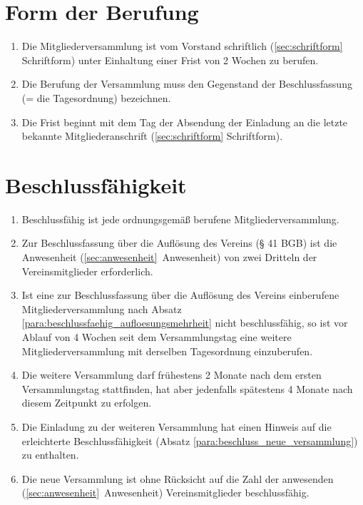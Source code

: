 \documentclass[a4paper]{article}
\begin{document}
\section{Form der Berufung}\label{sec:form_der_berufung}

\begin{enumerate}
\item Die Mitgliederversammlung ist vom Vorstand schriftlich (\ref{sec:schriftform} Schriftform) unter Einhaltung einer Frist von 2 Wochen zu berufen.
\item Die Berufung der Versammlung muss den Gegenstand der Beschlussfassung (= die Tagesordnung) bezeichnen.
\item Die Frist beginnt mit dem Tag der Absendung der Einladung an die letzte bekannte Mitgliederanschrift (\ref{sec:schriftform} Schriftform).
\end{enumerate}


\section{Beschlussfähigkeit}\label{sec:beschlussfaehigkeit}

\begin{enumerate}
\item Beschlussfähig ist jede ordnungsgemäß berufene Mitgliederversammlung.\label{para:beschlussfaehig_ordnungsgemaess}
\item Zur Beschlussfassung über die Auflösung des Vereins (§ 41 BGB) ist die Anwesenheit (\ref{sec:anwesenheit}~Anwesenheit) von zwei Dritteln der Vereinsmitglieder erforderlich.\label{para:beschlussfaehig_aufloesungsmehrheit}
\item Ist eine zur Beschlussfassung über die Auflösung des Vereins einberufene Mitgliederversammlung nach Absatz \ref{para:beschlussfaehig_aufloesungsmehrheit} nicht beschlussfähig, so ist vor Ablauf von 4 Wochen seit dem Versammlungstag eine weitere Mitgliederversammlung mit derselben Tagesordnung einzuberufen.\label{para:beschlussfaehig_alternative_mv}
\item Die weitere Versammlung darf frühestens 2 Monate nach dem ersten Versammlungstag stattfinden, hat aber jedenfalls spätestens 4 Monate nach diesem Zeitpunkt zu erfolgen.
\item Die Einladung zu der weiteren Versammlung hat einen Hinweis auf die erleichterte Beschlussfähigkeit (Absatz \ref{para:beschluss_neue_versammlung}) zu enthalten.
\item Die neue Versammlung ist ohne Rücksicht auf die Zahl der anwesenden (\ref{sec:anwesenheit}~Anwesenheit) Vereinsmitglieder beschlussfähig.\label{para:beschluss_neue_versammlung}
\end{enumerate}
\end{document}
